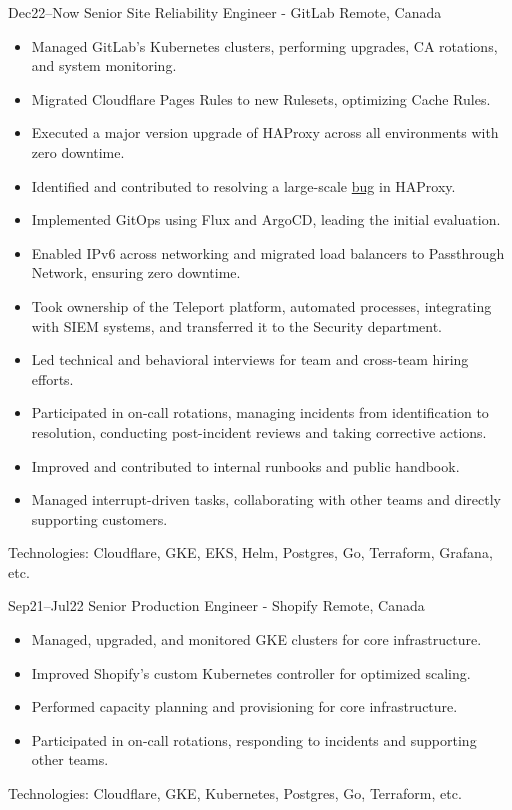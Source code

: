 \documentclass[]{cv-style}                     %
\begin{document}
\begin{entrylist}

  \entry
  {\small Dec22--Now}
  {Senior Site Reliability Engineer - GitLab}
  {Remote, Canada}
  {
    \begin{itemize}
      \item Managed GitLab's Kubernetes clusters, performing upgrades, CA rotations, and system monitoring.
      \item Migrated Cloudflare Pages Rules to new Rulesets, optimizing Cache Rules.
      \item Executed a major version upgrade of HAProxy across all environments with zero downtime.
      \item Identified and contributed to resolving a large-scale \href{https://github.com/haproxy/haproxy/issues/2262}{bug} in HAProxy.
      \item Implemented GitOps using Flux and ArgoCD, leading the initial evaluation.
      \item Enabled IPv6 across networking and migrated load balancers to Passthrough Network, ensuring zero downtime.
      \item Took ownership of the Teleport platform, automated processes, integrating with SIEM systems, and transferred it to the Security department.
      \item Led technical and behavioral interviews for team and cross-team hiring efforts.
      \item Participated in on-call rotations, managing incidents from identification to resolution, conducting post-incident reviews and taking corrective actions.
      \item Improved and contributed to internal runbooks and public handbook.
      \item Managed interrupt-driven tasks, collaborating with other teams and directly supporting customers.
    \end{itemize}
    Technologies: Cloudflare, GKE, EKS, Helm, Postgres, Go, Terraform, Grafana, etc.
  }

  \entry
  {\small Sep21--Jul22}
  {Senior Production Engineer - Shopify}
  {Remote, Canada}
  {
    \begin{itemize}
      \item Managed, upgraded, and monitored GKE clusters for core infrastructure.
      \item Improved Shopify’s custom Kubernetes controller for optimized scaling.
      \item Performed capacity planning and provisioning for core infrastructure.
      \item Participated in on-call rotations, responding to incidents and supporting other teams.
    \end{itemize}
    Technologies: Cloudflare, GKE, Kubernetes, Postgres, Go, Terraform, etc.
  }


\end{entrylist}
\end{document}
